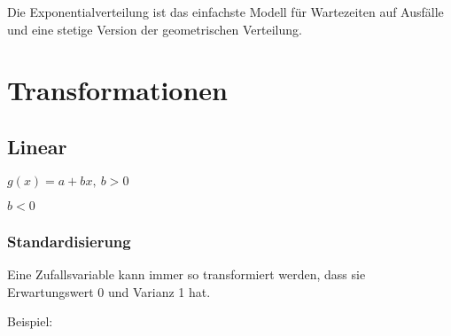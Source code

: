 \documentclass[8pt,a4paper]{scrartcl}
\begin{document}
\begin{multicols*}{3}
Die Exponentialverteilung ist das einfachste Modell für Wartezeiten auf Ausfälle und eine stetige Version der geometrischen Verteilung.



\note{$W=[0,\infty)$}


\section{Transformationen}

\subsection{Linear}

$g(x)=a+bx,\ b>0$


\finn

$b<0$



\subsubsection{Standardisierung}

Eine Zufallsvariable kann immer so transformiert werden, dass sie Erwartungswert 0 und Varianz 1 hat.



Beispiel:



\end{multicols*}
\end{document}
